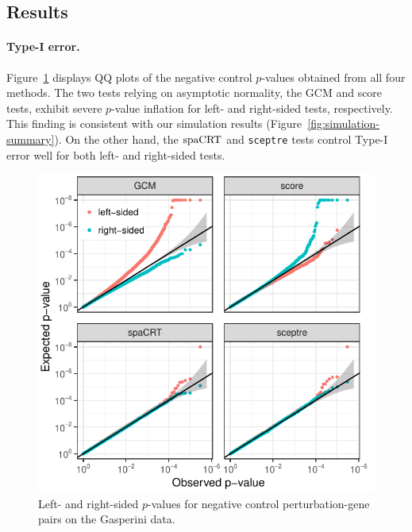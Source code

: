 \documentclass[12pt]{article}
\theoremstyle{definition}
\newcommand{\spacrt}{\textnormal{spaCRT}}               %
\begin{document}
\subsection{Results}

\paragraph{Type-I error.} Figure~\ref{fig:negative-control-qq-plots} displays QQ plots of the negative control $p$-values obtained from all four methods. The two tests relying on asymptotic normality, the GCM and score tests, exhibit severe $p$-value inflation for left- and right-sided tests, respectively. This finding is consistent with our simulation results (Figure~\ref{fig:simulation-summary}). On the other hand, the $\spacrt$ and \verb|sceptre| tests control Type-I error well for both left- and right-sided tests. 
\begin{figure}[h!]
	\centering
	\includegraphics{figures-and-tables/condensed-without-stratification.pdf}
	\caption{Left- and right-sided $p$-values for negative control perturbation-gene pairs on the Gasperini data.}
	\label{fig:negative-control-qq-plots}
\end{figure}
\end{document}
